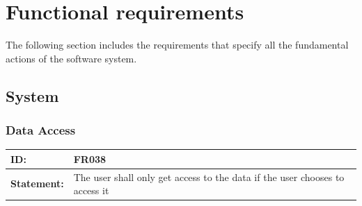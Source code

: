 \documentclass{scrreprt}
\begin{document}
\section{Functional requirements}
The following section includes the requirements that specify all the fundamental actions of the software system.
\subsection{System}
\subsubsection{Data Access}
\begin{center}
\begin{tabularx}{\linewidth}{| l | X |}
 \hline
 \textbf{ID:} & FR038  \\ 
 \hline
 \textbf{Statement:} & The user shall only get access to the data if the user chooses to access it
  \\ 
 \hline
\end{tabularx}

\end{center}
\end{document}
